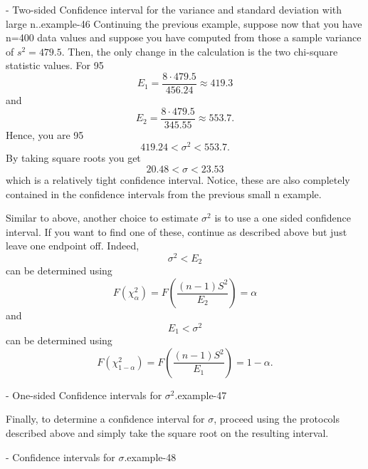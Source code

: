 \documentclass[10pt,]{book}
\numberwithin{equation}{section}
\newcommand{\lt}{<}
\begin{document}
 \begin{example}{- Two-sided Confidence interval for the variance and standard deviation with large n..}{example-46}%
\hypertarget{p-1144}{}%
Continuing the previous example, suppose now that you have n=400 data values and suppose you have computed from those a sample variance of \(s^2 = 479.5\).  Then, the only change in the calculation is the two chi-square statistic values. For 95%
\begin{equation*}
E_1 = \frac{8 \cdot 479.5}{456.24} \approx 419.3
\end{equation*}
and%
\begin{equation*}
E_2 = \frac{8 \cdot 479.5}{345.55} \approx 553.7.
\end{equation*}
Hence, you are 95%
\begin{equation*}
419.24 \lt \sigma^2 \lt 553.7.
\end{equation*}
By taking square roots you get%
\begin{equation*}
20.48 \lt \sigma \lt 23.53
\end{equation*}
which is a relatively tight confidence interval.  Notice, these are also completely contained in the confidence intervals from the previous small n example.%
\end{example}
%
\par
\hypertarget{p-1145}{}%
Similar to above, another choice to estimate \(\sigma ^2\) is to use a one sided confidence interval. If you want to find one of these, continue as described above but just leave one endpoint off.  Indeed,%
\begin{equation*}
\sigma^2 \lt E_2
\end{equation*}
can be determined using%
\begin{equation*}
F(\chi^2_{\alpha} ) = F \left ( \frac{(n-1)S^2}{E_2} \right ) = \alpha
\end{equation*}
and%
\begin{equation*}
E_1 \lt \sigma^2 
\end{equation*}
can be determined using%
\begin{equation*}
F(\chi^2_{1-\alpha} ) = F \left ( \frac{(n-1)S^2}{E_1} \right ) = 1 - \alpha.
\end{equation*}
\begin{example}{- One-sided Confidence intervals for \(\sigma^2\).}{example-47}%
\hypertarget{p-1146}{}%
%
\end{example}
%
\par
\hypertarget{p-1147}{}%
Finally, to determine a confidence interval for \(\sigma\), proceed using the protocols described above and simply take the square root on the resulting interval. \begin{example}{- Confidence intervals for \(\sigma\).}{example-48}%
\hypertarget{p-1148}{}%
%
\end{example}
%
%
%
\typeout{************************************************}
\typeout{************************************************}
%
\end{document}
